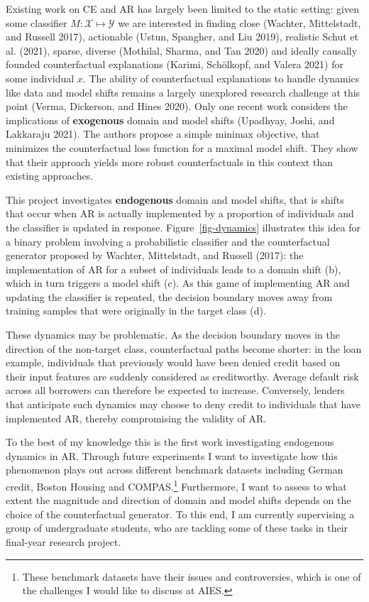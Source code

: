 \documentclass[
  sigconf]{acmart}
\begin{document}
Existing work on CE and AR has largely been limited to the static
setting: given some classifier \(M: \mathcal{X} \mapsto \mathcal{Y}\) we
are interested in finding close (Wachter, Mittelstadt, and Russell
2017), actionable (Ustun, Spangher, and Liu 2019), realistic Schut et
al. (2021), sparse, diverse (Mothilal, Sharma, and Tan 2020) and ideally
causally founded counterfactual explanations (Karimi, Schölkopf, and
Valera 2021) for some individual \(x\). The ability of counterfactual
explanations to handle dynamics like data and model shifts remains a
largely unexplored research challenge at this point (Verma, Dickerson,
and Hines 2020). Only one recent work considers the implications of
\textbf{exogenous} domain and model shifts (Upadhyay, Joshi, and
Lakkaraju 2021). The authors propose a simple minimax objective, that
minimizes the counterfactual loss function for a maximal model shift.
They show that their approach yields more robust counterfactuals in this
context than existing approaches.

This project investigates \textbf{endogenous} domain and model shifts,
that is shifts that occur when AR is actually implemented by a
proportion of individuals and the classifier is updated in response.
Figure~\ref{fig-dynamics} illustrates this idea for a binary problem
involving a probabilistic classifier and the counterfactual generator
proposed by Wachter, Mittelstadt, and Russell (2017): the implementation
of AR for a subset of individuals leads to a domain shift (b), which in
turn triggers a model shift (c). As this game of implementing AR and
updating the classifier is repeated, the decision boundary moves away
from training samples that were originally in the target class (d).

These dynamics may be problematic. As the decision boundary moves in the
direction of the non-target class, counterfactual paths become shorter:
in the loan example, individuals that previously would have been denied
credit based on their input features are suddenly considered as
creditworthy. Average default risk across all borrowers can therefore be
expected to increase. Conversely, lenders that anticipate such dynamics
may choose to deny credit to individuals that have implemented AR,
thereby compromising the validity of AR.

To the best of my knowledge this is the first work investigating
endogenous dynamics in AR. Through future experiments I want to
investigate how this phenomenon plays out across different benchmark
datasets including German credit, Boston Housing and COMPAS.\footnote{These
  benchmark datasets have their issues and controversies, which is one
  of the challenges I would like to discuss at AIES.} Furthermore, I
want to assess to what extent the magnitude and direction of domain and
model shifts depends on the choice of the counterfactual generator. To
this end, I am currently supervising a group of undergraduate students,
who are tackling some of these tasks in their final-year research
project.
\end{document}
